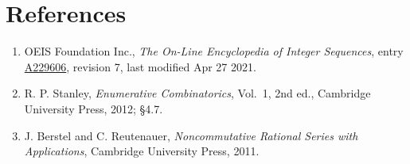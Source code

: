 \documentclass[11pt]{article}
\theoremstyle{definition}
\begin{document}
\section{References}

\begin{enumerate}

\item OEIS Foundation Inc., \emph{The On-Line Encyclopedia of Integer Sequences}, entry \href{https://oeis.org/A229606}{A229606}, revision 7, last modified Apr 27 2021.

\item R. P. Stanley, \emph{Enumerative Combinatorics}, Vol.~1, 2nd ed., Cambridge University Press, 2012; \S4.7.

\item J. Berstel and C. Reutenauer, \emph{Noncommutative Rational Series with Applications}, Cambridge University Press, 2011.

\end{enumerate}
\end{document}
